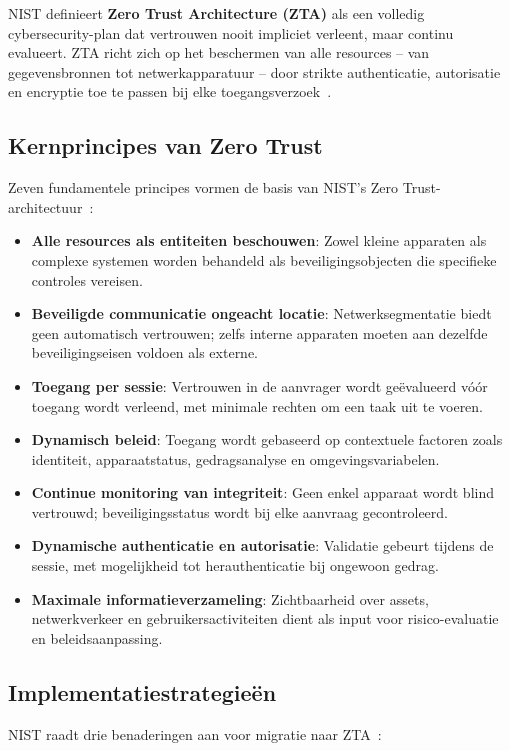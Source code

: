 \vspace{2ex}

NIST definieert \textbf{Zero Trust Architecture (ZTA)} als een volledig cybersecurity-plan dat vertrouwen nooit impliciet verleent, maar continu evalueert. ZTA richt zich op het beschermen van alle resources – van gegevensbronnen tot netwerkapparatuur – door strikte authenticatie, autorisatie en encryptie toe te passen bij elke toegangsverzoek~\autocite{NIST2020}.

\subsection{Kernprincipes van Zero Trust}
\label{sec:Kernprincipes van Zero Trust}
Zeven fundamentele principes vormen de basis van NIST’s Zero Trust-architectuur~\autocite{NIST2020}:  

\begin{itemize}
  \item \textbf{Alle resources als entiteiten beschouwen}: Zowel kleine apparaten als complexe systemen worden behandeld als beveiligingsobjecten die specifieke controles vereisen.  
  \item \textbf{Beveiligde communicatie ongeacht locatie}: Netwerksegmentatie biedt geen automatisch vertrouwen; zelfs interne apparaten moeten aan dezelfde beveiligingseisen voldoen als externe.  
  \item \textbf{Toegang per sessie}: Vertrouwen in de aanvrager wordt geëvalueerd vóór toegang wordt verleend, met minimale rechten om een taak uit te voeren.  
  \item \textbf{Dynamisch beleid}: Toegang wordt gebaseerd op contextuele factoren zoals identiteit, apparaatstatus, gedragsanalyse en omgevingsvariabelen.  
  \item \textbf{Continue monitoring van integriteit}: Geen enkel apparaat wordt blind vertrouwd; beveiligingsstatus wordt bij elke aanvraag gecontroleerd.  
  \item \textbf{Dynamische authenticatie en autorisatie}: Validatie gebeurt tijdens de sessie, met mogelijkheid tot herauthenticatie bij ongewoon gedrag.  
  \item \textbf{Maximale informatieverzameling}: Zichtbaarheid over assets, netwerkverkeer en gebruikersactiviteiten dient als input voor risico-evaluatie en beleidsaanpassing.  
\end{itemize}

\subsection{Implementatiestrategieën}
NIST raadt drie benaderingen aan voor migratie naar ZTA~\autocite{NIST2020}:


